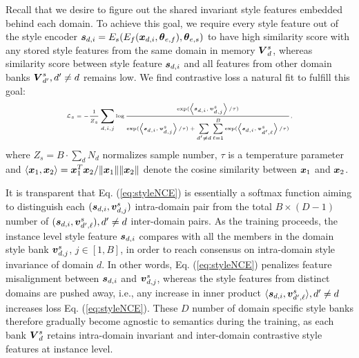 \documentclass[10pt,twocolumn,letterpaper]{article}
\newcommand{\bs}{\mbox{\boldmath $s$}}
\newcommand{\bv}{\mbox{\boldmath $v$}}
\newcommand{\bx}{\mbox{\boldmath $x$}}
\newcommand{\bV}{\mbox{\boldmath $V$}}
\newcommand{\btheta}{\mbox{\boldmath $\theta$}}
\newcommand{\0}{{\bf 0}}
\begin{document}
Recall that we desire to figure out the shared invariant style features embedded behind each domain. To achieve this goal, we require every style feature out of the style encoder $\bs_{d,i}=E_{s}(E_f(\bx_{d,i}, \btheta_{e,f}), \btheta_{e, s})$ to have high similarity score with any stored style features from the same domain in memory $\bV^s_d$, whereas similarity score between style feature $\bs_{d,i}$ and all features from other domain banks $\bV^s_{d'}, {d'} \neq d$ remains low. We find contrastive loss \cite{he2020momentum,tian2019contrastive} a natural fit to fulfill this goal:
\begin{equation}
\label{eq:styleNCE}
\tiny
\mathcal{L}_s= -  \frac{1}{Z_s} \sum_{d,i,j}
 \log    \frac{\exp( \left \langle \bs_{d,i},  \bv_{d,j}^s \right \rangle / \tau)}{\exp( \left \langle \bs_{d,i},  \bv_{d,j}^s \right \rangle / \tau) + \sum\limits_{d' \neq d} \sum\limits_{\ell=1}^{B}  \exp( \left \langle \bs_{d,i},  \bv_{d',\ell}^{s} \right \rangle / \tau)},
\end{equation}
where $Z_s=B\cdot  \sum_d N_d$ normalizes sample number, $\tau$ is a temperature parameter and $\left \langle \bx_1, \bx_2 \right \rangle  = \bx_1^T \bx_2/ \| \bx_1\| \| \bx_2\|$ denote the cosine similarity between $\bx_1$ and $\bx_2$.

It is transparent that Eq. (\ref{eq:styleNCE}) is essentially a softmax function aiming to distinguish each $( \bs_{d,i},  \bv_{d,j}^s )$ intra-domain pair from the total $B \times (D-1)$ number of $(\bs_{d,i},  \bv_{d',\ell}^{s}), d' \neq d $ inter-domain pairs. As the training proceeds, the instance level style feature $\bs_{d,i}$ compares with all the members in the domain style bank $\bv_{d,j}^s$, $j\in [1,B]$, in order to reach consensus on intra-domain style invariance of domain $d$. In other words, Eq. (\ref{eq:styleNCE}) penalizes feature misalignment between $\bs_{d,i}$ and $\bv_{d,j}^s$, whereas the style features from distinct domains are pushed away, i.e., any increase in inner product $\langle \bs_{d,i},  \bv_{d',\ell}^{s} \rangle, d' \neq d$ increases loss Eq. (\ref{eq:styleNCE}). These $D$ number of domain specific style banks therefore gradually become agnostic to semantics during the training, as each bank $\bV^s_d$ retains intra-domain invariant and inter-domain contrastive style features at instance level.
\end{document}
